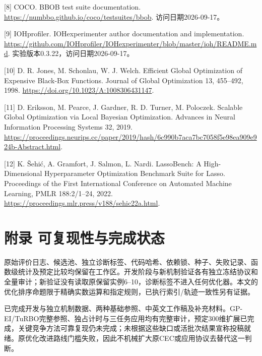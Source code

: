 \documentclass[11pt,a4paper]{article}
\begin{document}
{[}8{]} COCO. BBOB test suite documentation.
\url{https://numbbo.github.io/coco/testsuites/bbob}.
访问日期2026-09-17。

{[}9{]} IOHprofiler. IOHexperimenter author documentation and
implementation.
\url{https://github.com/IOHprofiler/IOHexperimenter/blob/master/ioh/README.md}.
实验版本0.3.22，访问日期2026-09-17。

{[}10{]} D. R. Jones, M. Schonlau, W. J. Welch. Efficient Global
Optimization of Expensive Black-Box Functions. Journal of Global
Optimization 13, 455--492, 1998.
\url{https://doi.org/10.1023/A:1008306431147}.

{[}11{]} D. Eriksson, M. Pearce, J. Gardner, R. D. Turner, M. Poloczek.
Scalable Global Optimization via Local Bayesian Optimization. Advances
in Neural Information Processing Systems 32, 2019.
\url{https://proceedings.neurips.cc/paper/2019/hash/6c990b7aca7bc7058f5e98ea909e924b-Abstract.html}.

{[}12{]} K. Šehić, A. Gramfort, J. Salmon, L. Nardi. LassoBench: A
High-Dimensional Hyperparameter Optimization Benchmark Suite for Lasso.
Proceedings of the First International Conference on Automated Machine
Learning, PMLR 188:2/1--24, 2022.
\url{https://proceedings.mlr.press/v188/sehic22a.html}.

\hypertarget{ux9644ux5f55-ux53efux590dux73b0ux6027ux4e0eux5b8cux6210ux72b6ux6001}{%
\section{附录
可复现性与完成状态}\label{ux9644ux5f55-ux53efux590dux73b0ux6027ux4e0eux5b8cux6210ux72b6ux6001}}

原始评价日志、候选池、独立诊断标签、代码哈希、依赖锁、种子、失败记录、函数级统计及预定比较均保留在工作区。开发阶段与新机制验证各有独立冻结协议和全量审计；新验证没有读取原保留实例6--10，诊断标签不进入任何优化器。本文的优化排序命题限于精确实数运算和指定规则，已执行索引/轨迹一致性另有证据。

已完成开发与独立机制数据、两种基础参照、中英文工作稿及补充材料。GP-EI/TuRBO完整参照、独占计时与三任务应用均有完整审计，预定300维扩展已完成，关键竞争方法可靠复现仍未完成；未根据这些缺口或活批次结果宣称投稿就绪。原优化改进路线门槛失败，因此不机械扩大原CEC或应用协议去替代这一判断。
\end{document}
